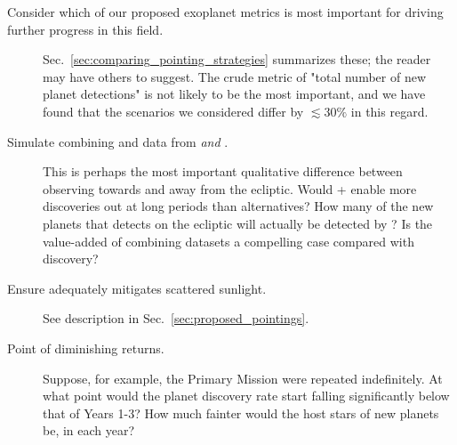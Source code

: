 \begin{description}
	\item[Consider which of our proposed exoplanet metrics is most important
	for driving further progress in this field.]  Sec.~\ref{sec:comparing_pointing_strategies} summarizes these; the reader may have others to suggest. The crude metric of "total number of new planet detections" is not
	likely to be the most important, and we have found that the scenarios we considered
	differ by $\lesssim30\%$ in
          this regard. 
	
	\item[Simulate combining \tess and \ktwo data from
          \rm{\elong\:} \textit{and} \rm{\eshort}.]  This is perhaps
          the most important qualitative difference between observing
          towards and away from the ecliptic.  Would \tess\!+\ktwo
          enable more discoveries out at long periods than
          alternatives?  How many of the new planets that \tess
          detects on the ecliptic will actually be detected by \ktwo?
          Is the value-added of combining datasets a compelling case
          compared with discovery?
          
    \item[Ensure {\rm \npole} adequately mitigates scattered sunlight.]
    See description in Sec.~\ref{sec:proposed_pointings}.
	
    \item[Point of diminishing returns.] Suppose, for example, the Primary Mission were repeated indefinitely.
    At what point would the planet discovery rate start falling significantly below that of Years 1-3?
    How much fainter would the host stars of new planets be, in each year?
	
\end{description}
